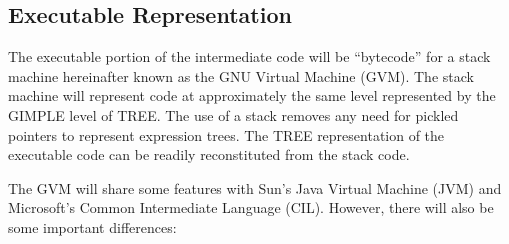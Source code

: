 \subsection{Executable Representation}
\label{sec:execrep}

The executable portion of the intermediate code will be ``bytecode''
for a stack machine hereinafter known as the GNU Virtual Machine
(GVM).  The stack machine will represent code at approximately the
same level represented by the GIMPLE level of TREE.  The use of a
stack removes any need for pickled pointers to represent expression
trees.  The TREE representation of the executable code can be readily
reconstituted from the stack code.

The GVM will share some features with Sun's Java Virtual Machine (JVM)
and Microsoft's Common Intermediate Language (CIL).  However, there
will also be some important differences:
